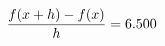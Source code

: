 \documentclass[preview]{standalone}
\begin{document}
\begin{align*}
\special{dvisvgm:raw <g id='unique000'>}\frac{f(x+h)-f(x)}{h} = 6.500\special{dvisvgm:raw </g>}
\end{align*}
\end{document}
